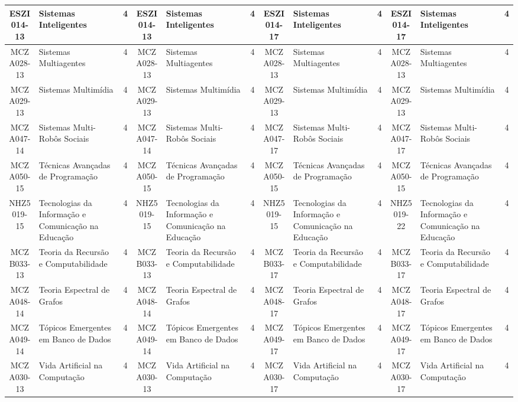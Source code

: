\documentclass[a4paper]{article}
\begin{document}
\begin{landscape}
{\begin{longtable}{|c|p{.2\textheight}|c||c|p{.2\textheight}|c||c|p{.2\textheight}|c||c|p{.2\textheight}|c|}
ESZI014-13 & Sistemas Inteligentes & 4 &
ESZI014-13 & Sistemas Inteligentes & 4 &
ESZI014-17 & Sistemas Inteligentes & 4 & 
ESZI014-17 & Sistemas Inteligentes & 4\\ \hline

MCZA028-13 & Sistemas Multiagentes & 4 &
MCZA028-13 & Sistemas Multiagentes & 4 &
MCZA028-13 & Sistemas Multiagentes & 4 &
MCZA028-13 & Sistemas Multiagentes & 4\\ \hline

MCZA029-13 & Sistemas Multimídia & 4 &
MCZA029-13 & Sistemas Multimídia & 4 &
MCZA029-13 & Sistemas Multimídia & 4 &
MCZA029-13 & Sistemas Multimídia & 4\\ \hline

MCZA047-14 & Sistemas Multi-Robôs Sociais & 4 &
MCZA047-14 & Sistemas Multi-Robôs Sociais & 4 &
MCZA047-17 & Sistemas Multi-Robôs Sociais & 4 &
MCZA047-17 & Sistemas Multi-Robôs Sociais & 4\\ \hline

MCZA050-15 & Técnicas Avançadas de Programação & 4 &
MCZA050-15 & Técnicas Avançadas de Programação & 4 &
MCZA050-15 & Técnicas Avançadas de Programação & 4 &
MCZA050-15 & Técnicas Avançadas de Programação & 4\\ \hline

NHZ5019-15 & Tecnologias da Informação e Comunicação na Educação & 4 &
NHZ5019-15 & Tecnologias da Informação e Comunicação na Educação & 4 &
NHZ5019-15 & Tecnologias da Informação e Comunicação na Educação & 4 &
NHZ5019-22 & Tecnologias da Informação e Comunicação na Educação & 4\\ \hline

MCZB033-13 & Teoria da Recursão e Computabilidade & 4 &
MCZB033-13 & Teoria da Recursão e Computabilidade & 4 &
MCZB033-17 & Teoria da Recursão e Computabilidade & 4 &
MCZB033-17 & Teoria da Recursão e Computabilidade & 4\\ \hline

MCZA048-14 & Teoria Espectral de Grafos & 4 &
MCZA048-14 & Teoria Espectral de Grafos & 4 &
MCZA048-17 & Teoria Espectral de Grafos & 4 &
MCZA048-17 & Teoria Espectral de Grafos & 4\\ \hline

MCZA049-14 & Tópicos Emergentes em Banco de Dados & 4 &
MCZA049-14 & Tópicos Emergentes em Banco de Dados & 4 &
MCZA049-17 & Tópicos Emergentes em Banco de Dados & 4 &
MCZA049-17 & Tópicos Emergentes em Banco de Dados & 4\\ \hline

MCZA030-13 & Vida Artificial na Computação & 4 &
MCZA030-13 & Vida Artificial na Computação & 4 &
MCZA030-17 & Vida Artificial na Computação & 4 &
MCZA030-17 & Vida Artificial na Computação & 4\\ \hline


\end{longtable}}
\end{landscape}
\end{document}
